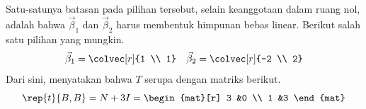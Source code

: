 \begin{example}
Satu-satunya batasan pada pilihan tersebut, selain keanggotaan dalam ruang nol,
adalah bahwa $\vec{\beta}_1$ dan $\vec{\beta}_2$
harus membentuk himpunan bebas linear.
Berikut salah satu pilihan yang mungkin.
\begin{equation*}
  \vec{\beta}_1=\colvec[r]{1 \\ 1}
  \quad
  \vec{\beta}_2=\colvec[r]{-2 \\ 2}
\end{equation*}
Dari sini,  menyatakan bahwa \( T \) serupa dengan
matriks berikut.
\begin{equation*}
  \rep{t}{B,B}=
  N+3I=
  \begin{mat}[r]
     3  &0  \\
     1  &3
  \end{mat}
\end{equation*}


\end{example}
